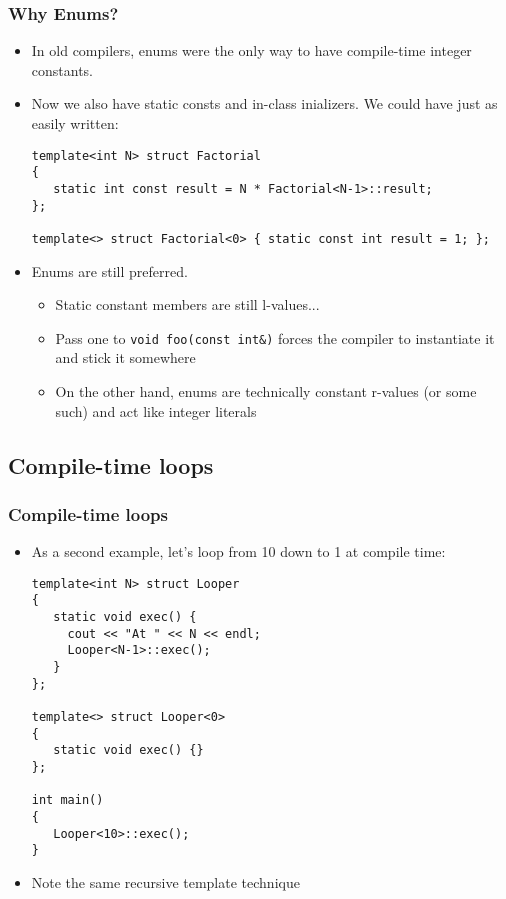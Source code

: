 \begin{frame}[fragile,t]
\frametitle{Why Enums?}
\begin{itemize}[<+->]
  \item In old compilers, enums were the only way to have compile-time
    integer constants.
  \item Now we also have static consts and in-class inializers.  We
    could have just as easily written:
{\scriptsize\begin{verbatim}
template<int N> struct Factorial
{
   static int const result = N * Factorial<N-1>::result;
};

template<> struct Factorial<0> { static const int result = 1; };

\end{verbatim}
}
\item Enums are still preferred.
\begin{itemize}
  \item Static constant members are still l-values...
  \item Pass one to \texttt{void foo(const int\&)} forces the compiler
    to instantiate it and stick it somewhere
  \item On the other hand, enums are technically constant r-values (or
    some such) and act like integer literals
\end{itemize}

\end{itemize}
\end{frame}

\subsection{Compile-time loops}

\begin{frame}[fragile,t]
\frametitle{Compile-time loops}
\begin{itemize}[<+->]
\item As a second example, let's loop from 10 down to 1 at compile
  time:
{\scriptsize\begin{verbatim}
template<int N> struct Looper
{
   static void exec() {
     cout << "At " << N << endl;
     Looper<N-1>::exec();
   }
};

template<> struct Looper<0>
{
   static void exec() {}
};

int main()
{
   Looper<10>::exec();
}

\end{verbatim}
}

\item Note the same recursive template technique

\end{itemize}

\end{frame}


